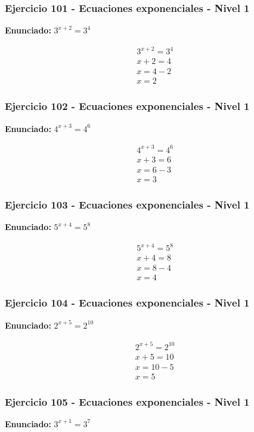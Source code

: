 \documentclass[12pt,a4paper]{article}
\begin{document}
\subsubsection*{Ejercicio 101 - Ecuaciones exponenciales - Nivel 1}
\textbf{Enunciado:} \(3^{x+2}=3^{4}\)

\[
\begin{aligned}
3^{x+2}=3^{4}\\
x+2=4\\
x=4-2\\
\boxed{x=2}
\end{aligned}
\]


\subsubsection*{Ejercicio 102 - Ecuaciones exponenciales - Nivel 1}
\textbf{Enunciado:} \(4^{x+3}=4^{6}\)

\[
\begin{aligned}
4^{x+3}=4^{6}\\
x+3=6\\
x=6-3\\
\boxed{x=3}
\end{aligned}
\]


\subsubsection*{Ejercicio 103 - Ecuaciones exponenciales - Nivel 1}
\textbf{Enunciado:} \(5^{x+4}=5^{8}\)

\[
\begin{aligned}
5^{x+4}=5^{8}\\
x+4=8\\
x=8-4\\
\boxed{x=4}
\end{aligned}
\]


\subsubsection*{Ejercicio 104 - Ecuaciones exponenciales - Nivel 1}
\textbf{Enunciado:} \(2^{x+5}=2^{10}\)

\[
\begin{aligned}
2^{x+5}=2^{10}\\
x+5=10\\
x=10-5\\
\boxed{x=5}
\end{aligned}
\]


\subsubsection*{Ejercicio 105 - Ecuaciones exponenciales - Nivel 1}
\textbf{Enunciado:} \(3^{x+1}=3^{7}\)
\end{document}
